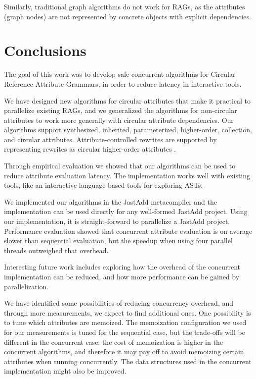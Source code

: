 {Similarly, traditional graph algorithms do not work for RAGs, as the attributes
(graph nodes) are not represented
by concrete objects with explicit dependencies.


\section{Conclusions}
\label{conclusions}

The goal of this work was to develop safe concurrent algorithms for
Circular Reference Attribute Grammars, in order to reduce latency in interactive tools.

We have designed new algorithms for circular attributes that make it practical to
parallelize existing RAGs, and we generalized the algorithms for non-circular attributes
to work more generally with circular attribute dependencies.
Our algorithms support synthesized, inherited, parameterized, higher-order, collection, and circular
attributes.  Attribute-controlled rewrites are supported by representing rewrites as circular
higher-order attributes \cite{DBLP:journals/cl/SoderbergH15}.

Through empirical evaluation we showed that our algorithms can be used to reduce
attribute evaluation latency. The implementation works well with existing tools,
like an interactive language-based tools for exploring ASTs.



We implemented our algorithms in the JastAdd metacompiler and the implementation can be
used directly for any well-formed JastAdd project. Using our implementation, it
is straight-forward to parallelize a JastAdd project.
Performance evaluation showed that concurrent attribute evaluation is
on average slower than sequential evaluation,
but the speedup when using four parallel threads outweighed that overhead.

Interesting future work includes exploring how the overhead of the concurrent implementation can be
reduced, and how more performance can be gained by parallelization.

We have identified some possibilities of reducing concurrency overhead, and through more
measurements, we expect to find additional ones. One possibility is to tune which attributes are
memoized. The memoization configuration we used for our measurements is tuned for the sequential
case, but the trade-offs will be different in the concurrent case: the cost of memoization is higher
in the concurrent algorithms, and therefore it may pay off to avoid memoizing certain attributes
when running concurrently. The data structures used in the concurrent implementation might also be
improved.

}
